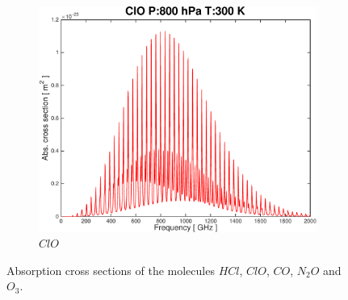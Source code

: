 \documentclass[paper=a4, fontsize=11pt]{scrartcl}
\begin{document}
\begin{figure}[ht]
\begin{subfigure}[b]{0.45\textwidth}
        \includegraphics[width=\textwidth]{plots/plot_xsec_ClO_800hPa_300K.pdf}
        \caption{$ClO$}
    \end{subfigure}

    \caption{Absorption cross sections of the molecules $HCl$, $ClO$, $CO$,
    $N_2O$ and $O_3$.\label{fig:abs_molecules}}
\end{figure}
\end{document}
